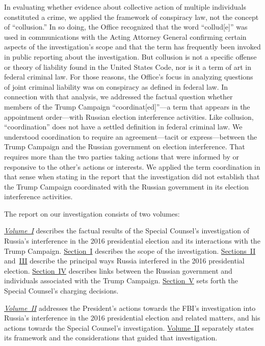 In evaluating whether evidence about collective action of multiple individuals constituted a crime, we applied the framework of conspiracy law, not the concept of ``collusion.''
In so doing, the Office recognized that the word ``collud[e]'' was used in communications with the Acting Attorney General confirming certain aspects of the investigation's scope and that the term has frequently been invoked in public reporting about the investigation.
But collusion is not a specific offense or theory of liability found in the United States Code, nor is it a term of art in federal criminal law.
For those reasons, the Office's focus in analyzing questions of joint criminal liability was on conspiracy as defined in federal law.
In connection with that analysis, we addressed the factual question whether members of the Trump Campaign ``coordinat[ed]''---a term that appears in the appointment order---with Russian election interference activities.
Like collusion, ``coordination'' does not have a settled definition in federal criminal law.
We understood coordination to require an agreement---tacit or express---between the Trump Campaign and the Russian government on election interference.
That requires more than the two parties taking actions that were informed by or responsive to the other's actions or interests.
We applied the term coordination in that sense when stating in the report that the investigation did not establish that the Trump Campaign coordinated with the Russian government in its election interference activities.

\hr

The report on our investigation consists of two volumes:

\hyperlink{chapter.1}{\textit{Volume~I}} describes the factual results of the Special Counsel's investigation of Russia's interference in the 2016 presidential election and its interactions with the Trump Campaign.
\hyperlink{section.1.1}{Section~I} describes the scope of the investigation.
\hyperlink{section.1.2}{Sections~II} and~\hyperlink{section.1.3}{III} describe the principal ways Russia interfered in the 2016 presidential election.
\hyperlink{section.1.4}{Section~IV} describes links between the Russian government and individuals associated with the Trump Campaign.
\hyperlink{section.1.5}{Section~V} sets forth the Special Counsel's charging decisions.

\hyperlink{chapter.2}{\textit{Volume~II}} addresses the President's actions towards the FBI's investigation into Russia's interference in the 2016 presidential election and related matters, and his actions towards the Special Counsel's investigation.
\hyperlink{chapter.2}{Volume~II} separately states its framework and the considerations that guided that investigation.
